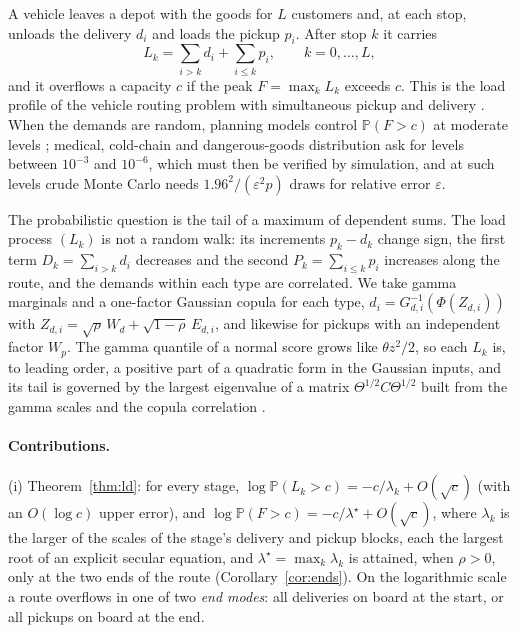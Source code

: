 \documentclass[11pt]{article}
\theoremstyle{definition}
\theoremstyle{remark}
\renewcommand{\P}{\mathbb{P}}
\begin{document}
A vehicle leaves a depot with the goods for $L$ customers and, at each stop, unloads
the delivery $d_i$ and loads the pickup $p_i$. After stop $k$ it carries
\[
L_k = \sum_{i>k} d_i + \sum_{i\le k} p_i ,\qquad k=0,\dots,L,
\]
and it overflows a capacity $c$ if the peak $F=\max_k L_k$ exceeds $c$. This is the
load profile of the vehicle routing problem with simultaneous pickup and delivery
\citep{Dethloff2001}. When the demands are random, planning models control
$\P(F>c)$ at moderate levels \citep{GendreauJabaliRei2016,GounarisWiesemannFloudas2013,
DinhFukasawaLuedtke2018,GhosalWiesemann2020}; medical, cold-chain and dangerous-goods
distribution ask for levels between $10^{-3}$ and $10^{-6}$, which must then be verified
by simulation, and at such levels crude Monte Carlo needs $1.96^2/(\varepsilon^2 p)$
draws for relative error $\varepsilon$.

The probabilistic question is the tail of a maximum of dependent sums. The load process
$(L_k)$ is not a random walk: its increments $p_k-d_k$ change sign, the first term
$D_k=\sum_{i>k}d_i$ decreases and the second $P_k=\sum_{i\le k}p_i$ increases along the
route, and the demands within each type are correlated. We take gamma marginals and a
one-factor Gaussian copula for each type, $d_i = G_{d,i}^{-1}(\Phi(Z_{d,i}))$ with
$Z_{d,i}=\sqrt\rho\,W_d+\sqrt{1-\rho}\,E_{d,i}$, and likewise for pickups with an
independent factor $W_p$. The gamma quantile of a normal score grows like
$\theta z^2/2$, so each $L_k$ is, to leading order, a positive part of a quadratic form
in the Gaussian inputs, and its tail is governed by the largest eigenvalue of a matrix
$\Theta^{1/2}C\Theta^{1/2}$ built from the gamma scales and the copula correlation
\citep[the same structure appears in delta--gamma approximations of portfolio losses,][]
{GlassermanHeidelbergerShahabuddin2000}.

\paragraph{Contributions.}
(i) Theorem~\ref{thm:ld}: for every stage,
$\log\P(L_k>c) = -c/\lambda_k + O(\sqrt c)$ (with an $O(\log c)$ upper error), and
$\log\P(F>c) = -c/\lambda^\star + O(\sqrt c)$, where $\lambda_k$ is the larger of the
scales of the stage's delivery and pickup blocks, each the largest root of an explicit
secular equation, and $\lambda^\star = \max_k\lambda_k$ is attained, when $\rho>0$, only
at the two ends of the route (Corollary~\ref{cor:ends}). On the logarithmic scale a route overflows in
one of two \emph{end modes}: all deliveries on board at the start, or all pickups on
board at the end.
\end{document}
